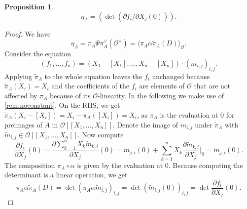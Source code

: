 \documentclass{article}
\theoremstyle{plain}%
\newtheorem{proposition}[theorem]{Proposition}
\theoremstyle{definition}
\theoremstyle{remark}
\begin{document}
\begin{proposition}\cite[proposition 5.19]{Darmon1995}
    \[
        \eta_A = (\det(\partial f_i/\partial X_j(0))).
    \]
\end{proposition}
\begin{proof}
    We have \[
        \eta_A = \pi_A \Psi \pi_A^\vee(\mathcal{O}^\vee) = \langle\pi_A\alpha \tilde \pi_A(D)\rangle_\mathcal{O}.
    \]
    Consider the equation
    \[
        (f_1, \dots, f_n) = (X_1 - [X_1], \dots, X_n - [X_n]) \cdot (m_{i,j})_{i,j}.
    \]
    Applying \(\tilde \pi_A\) to the whole equation leaves the \(f_i\) unchanged because \(\tilde \pi_A(X_i) = X_i\)
    and the coefficients of the \(f_i\) are elements of \(\mathcal{O}\) that are not affected by \(\pi_A\)
    because of its \(\mathcal{O}\)-linearity.
    In the following we make use of \cref{rem:noconstant}.
    On the RHS, we get \(\tilde \pi_A(X_i - [X_i]) = X_i - \pi_A([X_i]) = X_i\), as \(\pi_A\) 
    is the evaluation at \(0\) for preimages of \(A\) in \(\mathcal{O}[[X_1, \dots, X_n]]\).
    Denote the image of \(m_{i,j}\) under \(\tilde \pi_A\) with \(\tilde m_{i,j} \in \mathcal{O}[[X_1, \dots, X_n]]\).
    Now compute
    \[
        \frac{\partial f_i}{\partial X_j}(0) = \frac{\partial \sum_{k=1}^n X_k\tilde m_{k,i}}{\partial X_j}(0) 
        = \tilde m_{j,i}(0) + \sum_{k=1}^n X_k \frac{\partial \tilde m_{k,i}}{\partial X_j}\bigg|_{0} 
        = \tilde m_{j,i}(0).
    \]
    The composition \(\pi_A \circ \alpha\) is given by the evaluation at \(0\).
    Because computing the determinant is a linear operation, we get
    \[
        \pi_A \alpha \tilde \pi_A(D) = \det(\pi_A\alpha \tilde m_{i,j})_{i,j} = \det(\tilde m_{i,j}(0))_{i,j}
        = \det \frac{\partial f_i}{\partial X_j}(0).
    \]
\end{proof}
\end{document}
